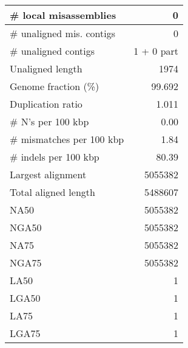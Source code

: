 \documentclass[12pt,a4paper]{article}
\begin{document}
\begin{table}[ht]
\begin{center}
\begin{tabular}{|l*{1}{|r}|}
\# local misassemblies & 0 \\ \hline
\# unaligned mis. contigs & 0 \\ \hline
\# unaligned contigs & 1 + 0 part \\ \hline
Unaligned length & 1974 \\ \hline
Genome fraction (\%) & 99.692 \\ \hline
Duplication ratio & 1.011 \\ \hline
\# N's per 100 kbp & 0.00 \\ \hline
\# mismatches per 100 kbp & 1.84 \\ \hline
\# indels per 100 kbp & 80.39 \\ \hline
Largest alignment & 5055382 \\ \hline
Total aligned length & 5488607 \\ \hline
NA50 & 5055382 \\ \hline
NGA50 & 5055382 \\ \hline
NA75 & 5055382 \\ \hline
NGA75 & 5055382 \\ \hline
LA50 & 1 \\ \hline
LGA50 & 1 \\ \hline
LA75 & 1 \\ \hline
LGA75 & 1 \\ \hline
\end{tabular}
\end{center}
\end{table}
\end{document}
